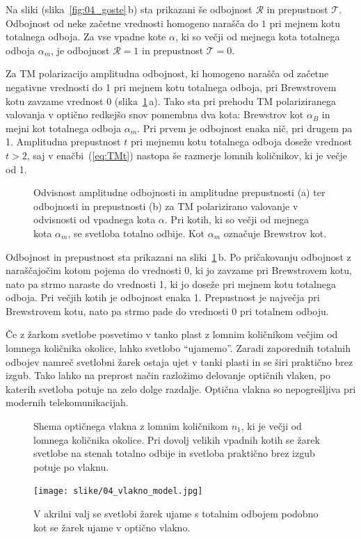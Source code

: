 Na sliki (slika~\ref{fig:04_goste}\,b) sta prikazani še odbojnost $\mathcal{R}$ 
in prepustnost $\mathcal{T}$. Odbojnost od neke začetne vrednosti homogeno
narašča do $1$ pri mejnem kotu totalnega odboja. Za vse vpadne kote $\alpha$, ki
so večji od mejnega kota totalnega odboja $\alpha_m$, je odbojnost $\mathcal{R} = 1$ in 
prepustnost $\mathcal{T} = 0$.

Za TM polarizacijo amplitudna odbojnost, ki homogeno
narašča od začetne negativne vrednosti do 1 pri mejnem
kotu totalnega odboja, pri Brewstrovem kotu zavzame vrednost 0 (slika~\ref{fig:04_gostm}\,a). 
Tako sta pri prehodu TM polariziranega valovanja v optično redkejšo
snov pomembna dva kota: Brewstrov kot $\alpha_B$ in mejni kot totalnega odboja $\alpha_m$.
Pri prvem je odbojnost enaka nič, pri drugem pa 1. Amplitudna prepustnost $t$ pri mejnemu kotu 
totalnega odboja doseže vrednost $t>2$, 
saj v enačbi~(\ref{eq:TMt}) nastopa še razmerje lomnih količnikov, ki je 
večje od 1. 
\begin{figure}[ht]
\centering
\def\svgwidth{140truemm} 

\caption{Odvisnost amplitudne odbojnosti in amplitudne prepustnosti (a) ter odbojnosti in 
prepustnosti (b) za TM polarizirano valovanje v odvisnosti od vpadnega kota $\alpha$. 
Pri kotih, ki so večji od mejnega kota $\alpha_m$, se svetloba totalno odbije. Kot $\alpha_m$
označuje Brewstrov kot.}
\label{fig:04_gostm}
\end{figure}

Odbojnost in prepustnost sta prikazani na sliki~\ref{fig:04_gostm}\,b. Po pričakovanju 
odbojnost z naraščajočim kotom pojema do vrednosti 0, ki jo zavzame pri Brewstrovem kotu, 
nato pa strmo naraste do vrednosti 1, ki jo doseže pri mejnem kotu totalnega odboja. Pri večjih
kotih je odbojnost enaka 1. Prepustnost je največja pri Brewstrovem kotu, nato pa strmo
pade do vrednosti 0 pri totalnem odboju.

\begin{remark}
Če z žarkom svetlobe posvetimo v tanko plast z lomnim količnikom večjim od 
lomnega količnika okolice, lahko svetlobo ``ujamemo''. Zaradi
zaporednih totalnih odbojev namreč svetlobni žarek ostaja ujet v tanki plasti in se 
širi praktično brez izgub. Tako lahko na preprost način razložimo delovanje optičnih vlaken, 
po katerih svetloba potuje na zelo dolge razdalje. Optična vlakna so nepogrešljiva
pri modernih telekomunikacijah.
\begin{figure}[ht]
\centering
\def\svgwidth{130truemm} 

\caption{Shema optičnega vlakna z lomnim količnikom $n_1$, ki je večji od lomnega količnika
okolice. Pri dovolj velikih vpadnih kotih se žarek svetlobe na stenah totalno odbije in svetloba
praktično brez izgub potuje po vlaknu.}
\label{fig:04_vlakno}
\end{figure}

\begin{figure}[ht]
\centering
\texttt{[image: slike/04\_vlakno\_model.jpg]}
\caption{V akrilni valj se svetlobi žarek ujame s totalnim odbojem podobno kot se žarek
ujame v optično vlakno.}
\label{fig:04_vlaknomodel}
\end{figure}
\end{remark}

